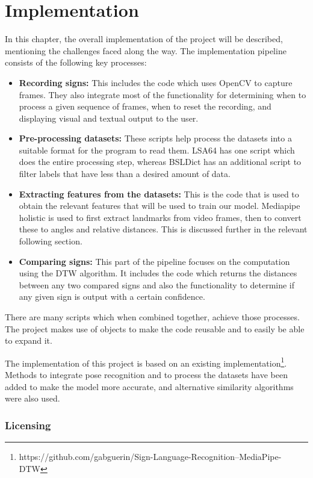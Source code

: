 \documentclass[final,rdr32.tex]{subfiles}
\begin{document}
\chapter{Implementation}

In this chapter, the overall implementation of the project will be described, mentioning the challenges faced along the way. The implementation pipeline consists of the following key processes:

\begin{itemize}
    \item \textbf{Recording signs: }This includes the code which uses OpenCV to capture frames. They also integrate most of the functionality for determining when to process a given sequence of frames, when to reset the recording, and displaying visual and textual output to the user.
    \item \textbf{Pre-processing datasets: }These scripts help process the datasets into a suitable format for the program to read them. LSA64 has one script which does the entire processing step, whereas BSLDict has an additional script to filter labels that have less than a desired amount of data.
    \item \textbf{Extracting features from the datasets: }This is the code that is used to obtain the relevant features that will be used to train our model. Mediapipe holistic is used to first extract landmarks from video frames, then to convert these to angles and relative distances. This is discussed further in the relevant following section.
    \item \textbf{Comparing signs: }This part of the pipeline focuses on the computation using the DTW algorithm. It includes the code which returns the distances between any two compared signs and also the functionality to determine if any given sign is output with a certain confidence.
\end{itemize}

There are many scripts which when combined together, achieve those processes. The project makes use of objects to make the code reusable and to easily be able to expand it.

The implementation of this project is based on an existing implementation\footnote{https://github.com/gabguerin/Sign-Language-Recognition--MediaPipe-DTW}. Methods to integrate pose recognition and to process the datasets have been added to make the model more accurate, and alternative similarity algorithms were also used.

\subsection*{Licensing}
\end{document}
